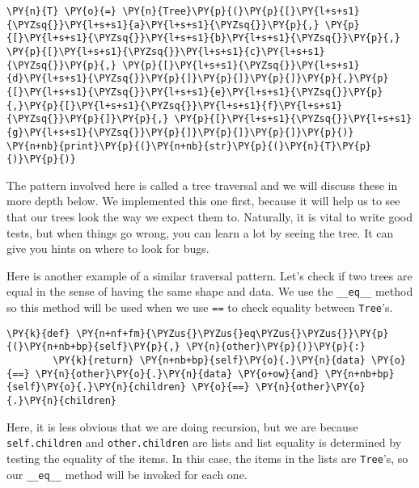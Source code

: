 \begin{Verbatim}[commandchars=\\\{\}]
\PY{n}{T} \PY{o}{=} \PY{n}{Tree}\PY{p}{(}\PY{p}{[}\PY{l+s+s1}{\PYZsq{}}\PY{l+s+s1}{a}\PY{l+s+s1}{\PYZsq{}}\PY{p}{,} \PY{p}{[}\PY{l+s+s1}{\PYZsq{}}\PY{l+s+s1}{b}\PY{l+s+s1}{\PYZsq{}}\PY{p}{,} \PY{p}{[}\PY{l+s+s1}{\PYZsq{}}\PY{l+s+s1}{c}\PY{l+s+s1}{\PYZsq{}}\PY{p}{,} \PY{p}{[}\PY{l+s+s1}{\PYZsq{}}\PY{l+s+s1}{d}\PY{l+s+s1}{\PYZsq{}}\PY{p}{]}\PY{p}{]}\PY{p}{]}\PY{p}{,}\PY{p}{[}\PY{l+s+s1}{\PYZsq{}}\PY{l+s+s1}{e}\PY{l+s+s1}{\PYZsq{}}\PY{p}{,}\PY{p}{[}\PY{l+s+s1}{\PYZsq{}}\PY{l+s+s1}{f}\PY{l+s+s1}{\PYZsq{}}\PY{p}{]}\PY{p}{,} \PY{p}{[}\PY{l+s+s1}{\PYZsq{}}\PY{l+s+s1}{g}\PY{l+s+s1}{\PYZsq{}}\PY{p}{]}\PY{p}{]}\PY{p}{]}\PY{p}{)}
\PY{n+nb}{print}\PY{p}{(}\PY{n+nb}{str}\PY{p}{(}\PY{n}{T}\PY{p}{)}\PY{p}{)}
\end{Verbatim}



The pattern involved here is called a tree traversal and we will discuss these in more depth below.
We implemented this one first, because it will help us to see that our trees look the way we expect them to.
Naturally, it is vital to write good tests, but when things go wrong, you can learn a lot by seeing the tree.
It can give you hints on where to look for bugs.


Here is another example of a similar traversal pattern.
Let's check if two trees are equal in the sense of having the same shape and data.  We use the \texttt{\_\_eq\_\_} method so this method will be used when we use \texttt{==} to check equality between \texttt{Tree}'s.

\begin{Verbatim}[commandchars=\\\{\}]
    \PY{k}{def} \PY{n+nf+fm}{\PYZus{}\PYZus{}eq\PYZus{}\PYZus{}}\PY{p}{(}\PY{n+nb+bp}{self}\PY{p}{,} \PY{n}{other}\PY{p}{)}\PY{p}{:}
        \PY{k}{return} \PY{n+nb+bp}{self}\PY{o}{.}\PY{n}{data} \PY{o}{==} \PY{n}{other}\PY{o}{.}\PY{n}{data} \PY{o+ow}{and} \PY{n+nb+bp}{self}\PY{o}{.}\PY{n}{children} \PY{o}{==} \PY{n}{other}\PY{o}{.}\PY{n}{children}
\end{Verbatim}



Here, it is less obvious that we are doing recursion, but we are because \texttt{self.children} and \texttt{other.children} are lists and list equality is determined by testing the equality of the items.  In this case, the items in the  lists are \texttt{Tree}'s, so our \texttt{\_\_eq\_\_} method will be invoked for each one.



